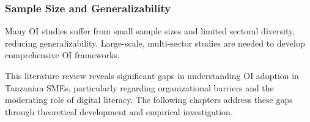 \subsubsection{Sample Size and Generalizability}
Many OI studies suffer from small sample sizes and limited sectoral diversity, reducing generalizability. Large-scale, multi-sector studies are needed to develop comprehensive OI frameworks.

This literature review reveals significant gaps in understanding OI adoption in Tanzanian SMEs, particularly regarding organizational barriers and the moderating role of digital literacy. The following chapters address these gaps through theoretical development and empirical investigation.